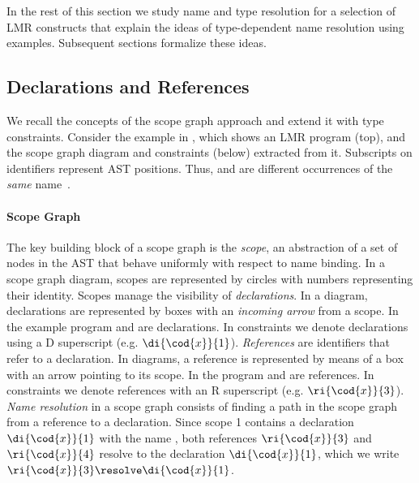 \noindent In the rest of this section we study name and type resolution for a
selection of LMR constructs that explain the ideas of type-dependent name
resolution using examples. Subsequent sections formalize these ideas.



\subsection{Declarations and References}

\newcommand{\ric}[2]{\ri{\cod{#1}}{#2}}
\newcommand{\dic}[2]{\di{\cod{#1}}{#2}}

We recall the concepts of the scope graph approach \cite{NeronTVW-ESOP-2015} and
extend it with type constraints.
Consider the example in , which shows an LMR program (top), and
the scope graph diagram and constraints (below) extracted from it.
Subscripts on identifiers represent AST positions. Thus,  and
 are different occurrences of the \emph{same} name~.

\paragraph{Scope Graph}

The key building block of a scope graph is the \emph{scope}, an abstraction of a
set of nodes in the AST that behave uniformly with respect to name binding.
In a scope graph diagram, scopes are represented by circles with numbers
representing their identity.
Scopes manage the visibility of \emph{declarations}. In a diagram, declarations
are represented by boxes with an \emph{incoming arrow} from a scope.
In the example program  and  are declarations. In
constraints we denote declarations using a {\sf D} superscript (e.g.
$\dic{x}{1}$).
\emph{References} are identifiers that refer to a declaration.
In diagrams, a reference is represented by means of a box with an arrow pointing
to its scope.
In the program  and  are references.
In constraints we denote references with an {\sf R} superscript (e.g.
$\ric{x}{3}$).
\emph{Name resolution} in a scope graph consists of finding a path in the scope
graph from a reference to a declaration. Since scope 1 contains a declaration
$\dic{x}{1}$ with the name , both references $\ric{x}{3}$ and
$\ric{x}{4}$ resolve to the declaration $\dic{x}{1}$, which we write $\ric{x}{3}
\resolve \dic{x}{1}$.


\begin{figure}[t]
  
\end{figure}

